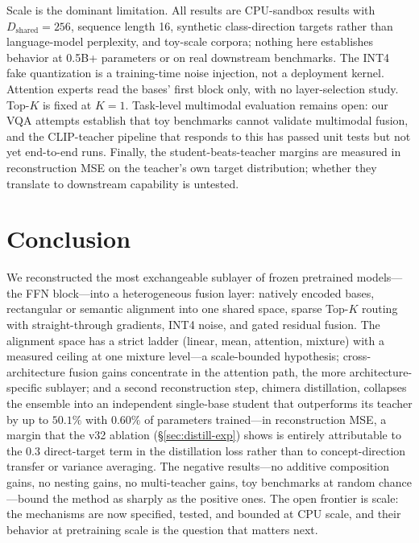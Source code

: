 \documentclass[10pt,twoside]{article}
\theoremstyle{definition}
\begin{document}
Scale is the dominant limitation. All results are CPU-sandbox results with $D_{\text{shared}}{=}256$, sequence length 16, synthetic class-direction targets rather than language-model perplexity, and toy-scale corpora; nothing here establishes behavior at 0.5B+ parameters or on real downstream benchmarks. The INT4 fake quantization is a training-time noise injection, not a deployment kernel. Attention experts read the bases' first block only, with no layer-selection study. Top-$K$ is fixed at $K{=}1$. Task-level multimodal evaluation remains open: our VQA attempts establish that toy benchmarks cannot validate multimodal fusion, and the CLIP-teacher pipeline that responds to this has passed unit tests but not yet end-to-end runs. Finally, the student-beats-teacher margins are measured in reconstruction MSE on the teacher's own target distribution; whether they translate to downstream capability is untested.

\section{Conclusion}
\label{sec:conclusion}

We reconstructed the most exchangeable sublayer of frozen pretrained models---the FFN block---into a heterogeneous fusion layer: natively encoded bases, rectangular or semantic alignment into one shared space, sparse Top-$K$ routing with straight-through gradients, INT4 noise, and gated residual fusion. The alignment space has a strict ladder (linear, mean, attention, mixture) with a measured ceiling at one mixture level---a scale-bounded hypothesis; cross-architecture fusion gains concentrate in the attention path, the more architecture-specific sublayer; and a second reconstruction step, chimera distillation, collapses the ensemble into an independent single-base student that outperforms its teacher by up to $50.1\%$ with $0.60\%$ of parameters trained---in reconstruction MSE, a margin that the v32 ablation (\S\ref{sec:distill-exp}) shows is entirely attributable to the $0.3$ direct-target term in the distillation loss rather than to concept-direction transfer or variance averaging. The negative results---no additive composition gains, no nesting gains, no multi-teacher gains, toy benchmarks at random chance---bound the method as sharply as the positive ones. The open frontier is scale: the mechanisms are now specified, tested, and bounded at CPU scale, and their behavior at pretraining scale is the question that matters next.
\end{document}
